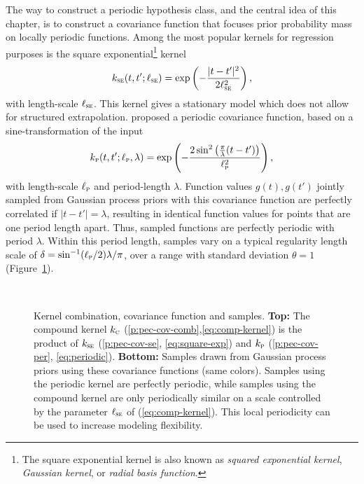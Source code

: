 The way to construct a periodic hypothesis class, and the central idea of this
chapter, is to construct a covariance function that focuses prior probability
mass on locally periodic functions. Among the most popular kernels for
regression purposes is the square exponential\footnote{The square exponential
kernel is also known as \emph{squared exponential kernel}, \emph{Gaussian
kernel}, or \emph{radial basis function}.} kernel
\vspace{-\baselineskip}
\begin{equation}
\label{eq:square-exp}
k_{\mathsc{se}}(t,t';\ell_\mathsc{se}) =
\exp\left(-\frac{|t-t'|^2}{2\ell_\mathsc{se}^{2}}\right),
\end{equation}
with length-scale $\ell_{\normalfont\textsc{se}}$. This kernel gives a stationary model
which does not allow for structured extrapolation.
\citeauthor{MacKay:1998:Introduction} proposed a periodic covariance function,
based on a sine-transformation of the input \cite{MacKay:1998:Introduction}
\begin{equation}
\label{eq:periodic}
k_\mathsc{p}(t,t';\ell_\mathsc{p},\lambda) =
\exp\left(-\frac{2\sin^2\left(\frac{\pi}{\lambda}
(t-t')\right)}{\ell_\mathsc{p}^2}\right),
\end{equation}
with length-scale $\ell_{\normalfont\textsc{p}}$ and period-length $\lambda$.
Function values $g(t), g(t')$ jointly sampled from Gaussian process
priors with this covariance function are perfectly correlated  if $|t-t'| =
\lambda$, resulting in identical function values for points that are one period
length apart. Thus, sampled functions are perfectly periodic with period
$\lambda$. Within this period length, samples vary on a typical regularity
length scale of $\delta = \sin^{-1}(\ell_{\normalfont\textsc{p}} /2)\lambda/\pi$, over a
range with standard deviation $\theta=1$ (Figure~\ref{fig:covariance}).

\begin{figure}
\setlength{}%
\setlength\figureheight{0.309\figurewidth}%
\centering%
\footnotesize%
\\
\caption[Kernel combination, covariance function and samples.]{Kernel
combination, covariance function and samples. {\bfseries Top:} The compound
kernel $k_{\normalfont\textsc{c}}$ (\ref*{p:pec-cov-comb},\eqref{eq:comp-kernel}) is the
product of $k_{\normalfont\textsc{se}}$ (\ref*{p:pec-cov-se}, \eqref{eq:square-exp}) and
$k_{\normalfont\textsc{p}}$ (\ref*{p:pec-cov-per}, \eqref{eq:periodic}). {\bfseries Bottom:}
Samples drawn from Gaussian process priors using these covariance functions
(same colors). Samples using the periodic kernel are perfectly periodic, while
samples using the compound kernel are only periodically similar on a scale
controlled by the parameter $\ell_{\normalfont\textsc{se}}$ of (\ref{eq:comp-kernel}). This
local periodicity can be used to increase modeling flexibility.}
\label{fig:covariance}
\end{figure}

